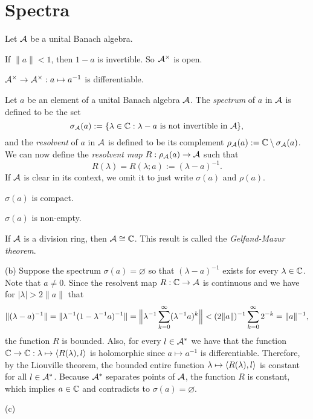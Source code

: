 \documentclass{../../large}
\begin{document}
\section{Spectra}

\begin{prb}

\end{prb}


\begin{prb}
Let $\mathcal{A}$ be a unital Banach algebra.
\begin{parts}
\item If $\|a\|<1$, then $1-a$ is invertible. So $\mathcal{A}^\times$ is open.
\item $\mathcal{A}^\times\to\mathcal{A}^\times:a\mapsto a^{-1}$ is differentiable.
\end{parts}
\end{prb}



\begin{prb}
Let $a$ be an element of a unital Banach algebra $\mathcal{A}$.
The \emph{spectrum} of $a$ in $\mathcal{A}$ is defined to be the set
\[\sigma_{\mathcal{A}}(a):=\{\lambda\in\mathbb{C}:\lambda-a\text{ is not invertible in }\mathcal{A}\},\]
and the \emph{resolvent} of $a$ in $\mathcal{A}$ is defined to be its complement $\rho_{\mathcal{A}}(a):=\mathbb{C}\setminus\sigma_{\mathcal{A}}(a)$.
We can now define the \emph{resolvent map} $R:\rho_{\mathcal{A}}(a)\to\mathcal{A}$ such that
\[R(\lambda)=R(\lambda;a):=(\lambda-a)^{-1}.\]
If $\mathcal{A}$ is clear in its context, we omit it to just write $\sigma(a)$ and $\rho(a)$.
\begin{parts}
\item $\sigma(a)$ is compact.
\item $\sigma(a)$ is non-empty.
\item If $\mathcal{A}$ is a division ring, then $\mathcal{A}\cong\mathbb{C}$. This result is called the \emph{Gelfand-Mazur theorem}.
\end{parts}
\end{prb}
\begin{pf}
(b)
Suppose the spectrum $\sigma(a)=\varnothing$ so that $(\lambda-a)^{-1}$ exists for every $\lambda\in\mathbb{C}$.
Note that $a\ne0$.
Since the resolvent map $R:\mathbb{C}\to\mathcal{A}$ is continuous and we have for $|\lambda|>2\|a\|$ that
\[\|(\lambda-a)^{-1}\|=\|\lambda^{-1}(1-\lambda^{-1}a)^{-1}\|
=\Bigl\|\lambda^{-1}\sum_{k=0}^\infty(\lambda^{-1}a)^k\Bigr\|
<(2\|a\|)^{-1}\sum_{k=0}^\infty2^{-k}=\|a\|^{-1},\]
the function $R$ is bounded.
Also, for every $l\in\mathcal{A}^*$ we have that the function $\mathbb{C}\to\mathbb{C}:\lambda\mapsto\langle R(\lambda),l\rangle$ is holomorphic since $a\mapsto a^{-1}$ is differentiable.
Therefore, by the Liouville theorem, the bounded entire function $\lambda\mapsto\langle R(\lambda),l\rangle$ is constant for all $l\in\mathcal{A}^*$.
Because $\mathcal{A}^*$ separates points of $\mathcal{A}$, the function $R$ is constant, which implies $a\in\mathbb{C}$ and contradicts to $\sigma(a)=\varnothing$.

(c)
\end{pf}
\end{document}
